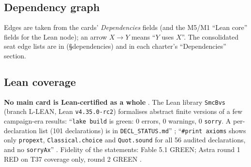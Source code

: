 \subsection{Dependency graph}\label{sec:theory-deps}

Edges are taken from the cards' \emph{Dependencies} fields (and the M5/M1 ``Lean core'' fields for the Lean node); an arrow $X\to Y$ means ``$Y$ uses $X$''. The consolidated seat edge lists are in  (§dependencies) and in each charter's ``Dependencies'' section.



\subsection{Lean coverage}\label{sec:theory-lean}

\textbf{No main card is Lean-certified as a whole} . The Lean library \texttt{SmcBvs} (branch L-LEAN, Lean \texttt{v4.35.0-rc2}) formalises abstract finite versions of a few campaign-era results: ``\texttt{lake build} is green: 0 errors, 0 warnings, 0 \texttt{sorry}. A per-declaration list (101 declarations) is in \texttt{DECL\_STATUS.md}'' ; ``\texttt{\#print axioms} shows only \texttt{propext}, \texttt{Classical.choice} and \texttt{Quot.sound} for all 56 audited declarations, and no \texttt{sorryAx}'' . Fidelity of the statements: Fable 5.1 GREEN; Astra round 1 RED on T37 coverage only, round 2 GREEN .


